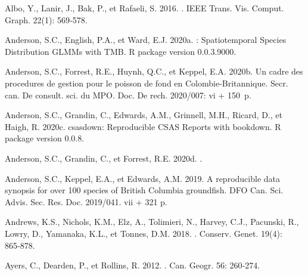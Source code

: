 \documentclass[french,11pt]{book}
\begin{document}
\hypertarget{refs}{}
\begin{CSLReferences}{1}{0}
%
Albo, Y., Lanir, J., Bak, P., et Rafaeli, S. 2016. . IEEE Trans. Vis. Comput. Graph. 22(1): 569‑578.

%
Anderson, S.C., English, P.A., et Ward, E.J. 2020a. : Spatiotemporal Species Distribution GLMMs with {TMB}. R package version 0.0.3.9000.

%
Anderson, S.C., Forrest, R.E., Huynh, Q.C., et Keppel, E.A. 2020b. Un cadre des procedures de gestion pour le poisson de fond en {Colombie-Britannique}. Secr. can. De consult. sci. du MPO. Doc. De rech. 2020/007: vi + 150~p.

%
Anderson, S.C., Grandin, C., Edwards, A.M., Grinnell, M.H., Ricard, D., et Haigh, R. 2020c. {csasdown}: Reproducible {CSAS} Reports with bookdown. R package version 0.0.8.

%
Anderson, S.C., Grandin, C., et Forrest, R.E. 2020d. .

%
Anderson, S.C., Keppel, E.A., et Edwards, A.M. 2019. A reproducible data synopsis for over 100 species of {British Columbia} groundfish. DFO Can. Sci. Advis. Sec. Res. Doc. 2019/041. vii + 321 p.

%
Andrews, K.S., Nichols, K.M., Elz, A., Tolimieri, N., Harvey, C.J., Pacunski, R., Lowry, D., Yamanaka, K.L., et Tonnes, D.M. 2018. . Conserv. Genet. 19(4): 865‑878.

%
Ayers, C., Dearden, P., et Rollins, R. 2012. . Can. Geogr. 56: 260‑274.


\end{CSLReferences}
\end{document}
